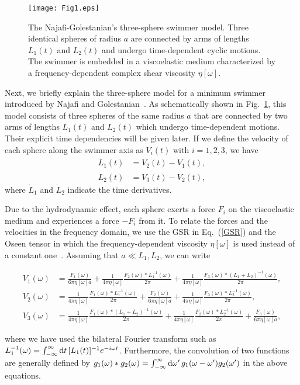 \documentclass[nofootinbib,twocolumn,showpacs,preprintnumbers,pre,aps]{revtex4-1}
\begin{document}
\begin{figure}[b]
\begin{center}
\texttt{[image: Fig1.eps]}
\end{center}
\caption{
The Najafi-Golestanian's three-sphere swimmer model.
Three identical spheres of radius $a$ are connected by arms of lengths $L_1(t)$ and  $L_2(t)$
and undergo time-dependent cyclic motions.
The swimmer is embedded in a viscoelastic medium characterized by a frequency-dependent 
complex shear viscosity $\eta[\omega]$. 
}
\label{model}
\end{figure}


Next, we briefly explain the three-sphere model for a minimum swimmer  
introduced by Najafi and Golestanian~\cite{Golestanian04,Golestanian08}. 
As schematically shown in Fig.~\ref{model}, this model consists of three spheres of 
the same radius $a$ that are connected by two arms of lengths $L_1(t)$ and $L_2(t)$ 
which undergo time-dependent motions.
Their explicit time dependencies will be given later.
If we define the velocity of each sphere along the swimmer axis as $V_i(t)$ 
with $i=1,2,3$, we have 
\begin{align}
\dot{L}_1(t)&=V_2(t)-V_1(t),
\label{L1dot}
\\
\dot{L}_2(t)&=V_3(t)-V_2(t),
\label{L2dot}
\end{align}
where $\dot{L}_1$ and $\dot{L}_2$ indicate the time derivatives.


Due to the hydrodynamic effect, each sphere exerts a force $F_i$  on the viscoelastic 
medium and experiences a force $-F_i$ from it.
To relate the forces and the velocities in the frequency domain, we use the GSR in 
Eq.~(\ref{GSR}) and the Oseen tensor in which the frequency-dependent viscosity 
$\eta[\omega]$ is used instead of a constant one~\cite{MW95,Mason00}.
Assuming that $a\ll L_1, L_2 $, we can write~\cite{Golestanian04,Golestanian08} 
\begin{widetext}
\begin{align}
\label{eq3}
V_1(\omega)&=\frac{F_1(\omega)}{6\pi\eta[\omega] a}+\frac{1}{4\pi\eta[\omega]}\frac{F_2(\omega) \ast L_1^{-1}(\omega)}{2\pi}+\frac{1}{4\pi\eta[\omega]}\frac{F_3(\omega) \ast (L_1+L_2)^{-1}(\omega)}{2\pi},\\
\label{eq4}
V_2(\omega)&=\frac{1}{4\pi\eta[\omega]} \frac{F_1(\omega) \ast L_1^{-1}(\omega)}{2\pi}+\frac{F_2(\omega)}{6\pi\eta[\omega] a}+\frac{1}{4\pi\eta[\omega] }\frac{F_3(\omega) \ast L_2^{-1}(\omega)}{2\pi},\\
\label{eq5}
V_3(\omega)&=\frac{1}{4\pi\eta[\omega] }\frac{F_1(\omega)\ast (L_1+L_2)^{-1}(\omega)}{2\pi}+\frac{1}{4\pi\eta[\omega] }\frac{F_2(\omega) \ast L_2^{-1}(\omega)}{2\pi}+\frac{F_3(\omega)}{6\pi\eta[\omega] a},
\end{align}
\end{widetext}
where we have used the bilateral Fourier transform such as 
$L_1^{-1}(\omega)=\int_{-\infty}^\infty {\rm d}t\,[L_1(t)]^{-1}e^{-i\omega t}$.
Furthermore, the convolution of two functions are generally defined by 
$g_1(\omega)\ast g_2(\omega)=\int _{-\infty}^\infty {\rm d}\omega'\, g_1(\omega-\omega')g_2(\omega')$
in the above equations.
\end{document}
